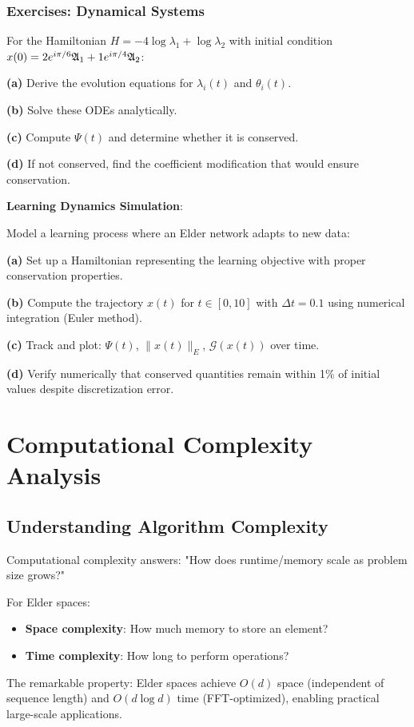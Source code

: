 \subsection{Exercises: Dynamical Systems}

\begin{exercise}
For the Hamiltonian $H = -4\log\lambda_1 + \log\lambda_2$ with initial condition $x(0) = 2e^{i\pi/6}\mathfrak{A}_{1} + 1e^{i\pi/4}\mathfrak{A}_{2}$:

\textbf{(a)} Derive the evolution equations for $\lambda_i(t)$ and $\theta_i(t)$.

\textbf{(b)} Solve these ODEs analytically.

\textbf{(c)} Compute $\Psi(t)$ and determine whether it is conserved.

\textbf{(d)} If not conserved, find the coefficient modification that would ensure conservation.
\end{exercise}

\begin{application}
\textbf{Learning Dynamics Simulation}:

Model a learning process where an Elder network adapts to new data:

\textbf{(a)} Set up a Hamiltonian representing the learning objective with proper conservation properties.

\textbf{(b)} Compute the trajectory $x(t)$ for $t \in [0, 10]$ with $\Delta t = 0.1$ using numerical integration (Euler method).

\textbf{(c)} Track and plot: $\Psi(t)$, $\|x(t)\|_E$, $\mathcal{G}(x(t))$ over time.

\textbf{(d)} Verify numerically that conserved quantities remain within 1\% of initial values despite discretization error.
\end{application}

\chapter{Computational Complexity Analysis}

\section{Understanding Algorithm Complexity}

\begin{intuition}
Computational complexity answers: "How does runtime/memory scale as problem size grows?" 

For Elder spaces:
\begin{itemize}
\item \textbf{Space complexity}: How much memory to store an element?
\item \textbf{Time complexity}: How long to perform operations?
\end{itemize}

The remarkable property: Elder spaces achieve $O(d)$ space (independent of sequence length) and $O(d \log d)$ time (FFT-optimized), enabling practical large-scale applications.
\end{intuition}

